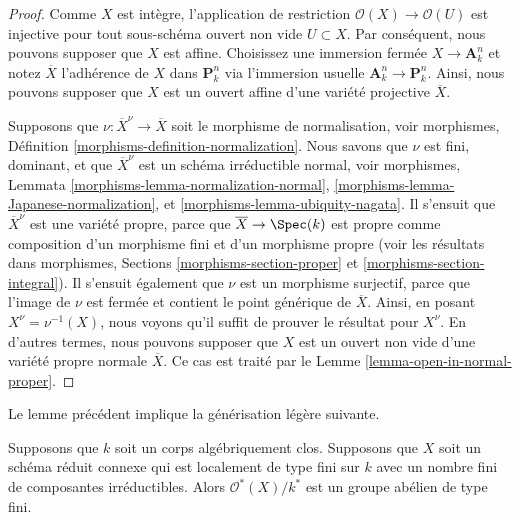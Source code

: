 \begin{proof}
Comme $X$ est intègre, l'application de restriction
$\mathcal{O}(X) \to \mathcal{O}(U)$ est injective pour
tout sous-schéma ouvert non vide $U \subset X$. Par
conséquent, nous pouvons supposer que $X$ est affine.
Choisissez une immersion fermée $X \to \mathbf{A}^n_k$
et notez $\overline{X}$ l'adhérence de $X$ dans
$\mathbf{P}^n_k$ via l'immersion usuelle $\mathbf{A}^n_k
\to \mathbf{P}^n_k$. Ainsi, nous pouvons supposer que $X$
est un ouvert affine d'une variété projective $\overline{X}$.

\medskip\noindent
Supposons que $\nu : \overline{X}^\nu \to \overline{X}$ soit
le morphisme de normalisation, voir morphismes, Définition
\ref{morphisms-definition-normalization}. Nous savons que
$\nu$ est fini, dominant, et que $\overline{X}^\nu$ est un
schéma irréductible normal, voir morphismes, Lemmata
\ref{morphisms-lemma-normalization-normal},
\ref{morphisms-lemma-Japanese-normalization}, et
\ref{morphisms-lemma-ubiquity-nagata}. Il s'ensuit que
$\overline{X}^\nu$ est une variété propre, parce que
$\overline{X} \to \Spec(k)$ est propre comme composition d'un
morphisme fini et d'un morphisme propre (voir les résultats dans
morphismes, Sections \ref{morphisms-section-proper} et
\ref{morphisms-section-integral}). Il s'ensuit également que $\nu$
est un morphisme surjectif, parce que l'image de $\nu$ est fermée
et contient le point générique de $\overline{X}$. Ainsi, en posant
$X^\nu = \nu^{-1}(X)$, nous voyons qu'il suffit de prouver le
résultat pour $X^\nu$. En d'autres termes, nous pouvons supposer que
$X$ est un ouvert non vide d'une variété propre normale
$\overline{X}$. Ce cas est traité par le Lemme \ref{lemma-open-in-normal-proper}.
\end{proof}

\noindent
Le lemme précédent implique la générisation légère suivante.

\begin{lemma}
\label{lemma-units-general-algebraically-closed}
Supposons que $k$ soit un corps algébriquement clos. Supposons
que $X$ soit un schéma réduit connexe qui est localement de type
fini sur $k$ avec un nombre fini de composantes irréductibles.
Alors $\mathcal{O}^*(X)/k^*$ est un groupe abélien de type fini.
\end{lemma}

